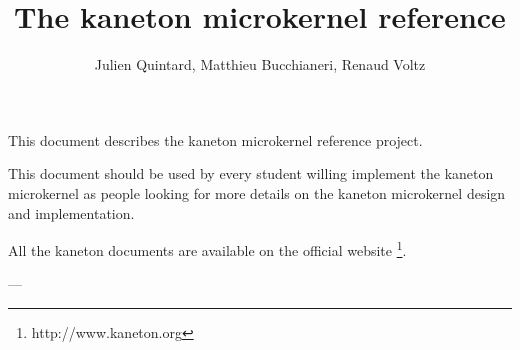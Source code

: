 
%
%



%
%

\rhead{}

%
%

\title{The kaneton microkernel reference
       \logos}

%
%

\author{\small{Julien Quintard},
        \small{Matthieu Bucchianeri},
        \small{Renaud Voltz}}

%
%



%
%

\maketitle

%
%

%
%

This document describes the kaneton microkernel reference project.

This document should be used by every student willing implement the
kaneton microkernel as people looking for more details on the kaneton
microkernel design and implementation.

All the kaneton documents are available on
the official website
  \footnote{http://www.kaneton.org}.

%
%

\tableofcontents

%
%









%

%
%
%
%



---

